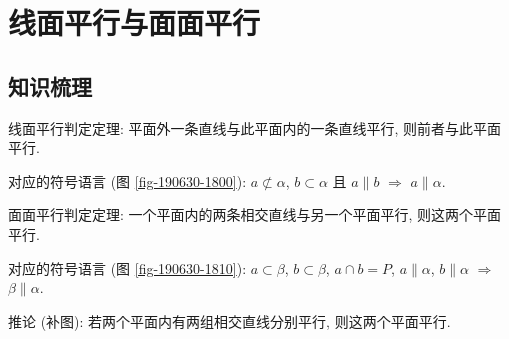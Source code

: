 
\section{线面平行与面面平行}

\subsection{知识梳理}
线面平行判定定理: 平面外一条直线与此平面内的一条直线平行, 则前者与此平面平行.

对应的符号语言 (图 \ref{fig-190630-1800}): $a\not\subset\alpha$, 
$b\subset\alpha$ 且 $a\parallel b$ $\Rightarrow$ $a\parallel\alpha$.

面面平行判定定理: 一个平面内的两条相交直线与另一个平面平行, 则这两个平面平行.

对应的符号语言 (图 \ref{fig-190630-1810}): $a\subset\beta$, 
$b\subset\beta$, $a\cap b= P$, $a\parallel\alpha$, $b\parallel\alpha$ 
$\Rightarrow$ $\beta\parallel\alpha$.

推论 (补图): 若两个平面内有两组相交直线分别平行, 则这两个平面平行.


